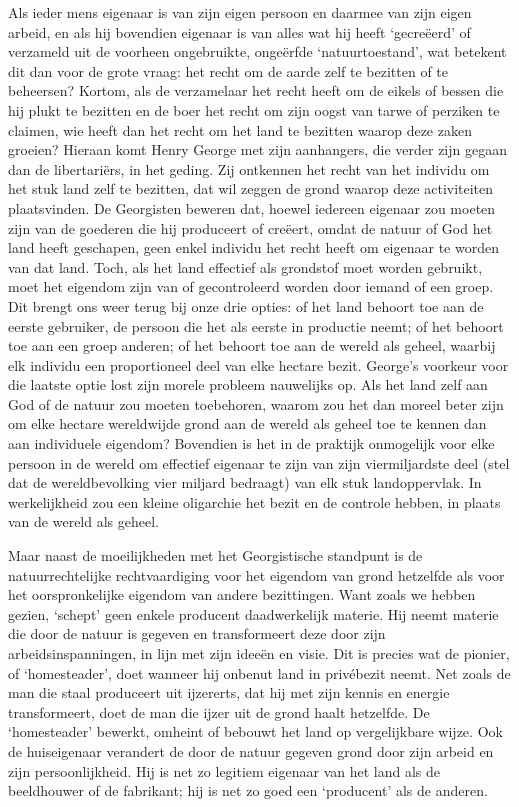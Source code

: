 \documentclass[
  a5paper,
  smalldemyvopaper,10pt,twoside,onecolumn,openright,extrafontsizes,hidelinks]{memoir}
\begin{document}
Als ieder mens eigenaar is van zijn eigen persoon en daarmee van zijn
eigen arbeid, en als hij bovendien eigenaar is van alles wat hij heeft
`gecreëerd' of verzameld uit de voorheen ongebruikte, ongeërfde
`natuurtoestand', wat betekent dit dan voor de grote vraag: het recht om
de aarde zelf te bezitten of te beheersen? Kortom, als de verzamelaar
het recht heeft om de eikels of bessen die hij plukt te bezitten en de
boer het recht om zijn oogst van tarwe of perziken te claimen, wie heeft
dan het recht om het land te bezitten waarop deze zaken groeien? Hieraan
komt Henry George met zijn aanhangers, die verder zijn gegaan dan de
libertariërs, in het geding. Zij ontkennen het recht van het individu om
het stuk land zelf te bezitten, dat wil zeggen de grond waarop deze
activiteiten plaatsvinden. De Georgisten beweren dat, hoewel iedereen
eigenaar zou moeten zijn van de goederen die hij produceert of creëert,
omdat de natuur of God het land heeft geschapen, geen enkel individu het
recht heeft om eigenaar te worden van dat land. Toch, als het land
effectief als grondstof moet worden gebruikt, moet het eigendom zijn van
of gecontroleerd worden door iemand of een groep. Dit brengt ons weer
terug bij onze drie opties: of het land behoort toe aan de eerste
gebruiker, de persoon die het als eerste in productie neemt; of het
behoort toe aan een groep anderen; of het behoort toe aan de wereld als
geheel, waarbij elk individu een proportioneel deel van elke hectare
bezit. George's voorkeur voor die laatste optie lost zijn morele
probleem nauwelijks op. Als het land zelf aan God of de natuur zou
moeten toebehoren, waarom zou het dan moreel beter zijn om elke hectare
wereldwijde grond aan de wereld als geheel toe te kennen dan aan
individuele eigendom? Bovendien is het in de praktijk onmogelijk voor
elke persoon in de wereld om effectief eigenaar te zijn van zijn
viermiljardste deel (stel dat de wereldbevolking vier miljard bedraagt)
van elk stuk landoppervlak. In werkelijkheid zou een kleine oligarchie
het bezit en de controle hebben, in plaats van de wereld als geheel.

Maar naast de moeilijkheden met het Georgistische standpunt is de
natuurrechtelijke rechtvaardiging voor het eigendom van grond hetzelfde
als voor het oorspronkelijke eigendom van andere bezittingen. Want zoals
we hebben gezien, `schept' geen enkele producent daadwerkelijk materie.
Hij neemt materie die door de natuur is gegeven en transformeert deze
door zijn arbeidsinspanningen, in lijn met zijn ideeën en visie. Dit is
precies wat de pionier, of `homesteader', doet wanneer hij onbenut land
in privébezit neemt. Net zoals de man die staal produceert uit
ijzererts, dat hij met zijn kennis en energie transformeert, doet de man
die ijzer uit de grond haalt hetzelfde. De `homesteader' bewerkt,
omheint of bebouwt het land op vergelijkbare wijze. Ook de huiseigenaar
verandert de door de natuur gegeven grond door zijn arbeid en zijn
persoonlijkheid. Hij is net zo legitiem eigenaar van het land als de
beeldhouwer of de fabrikant; hij is net zo goed een `producent' als de
anderen.
\end{document}
